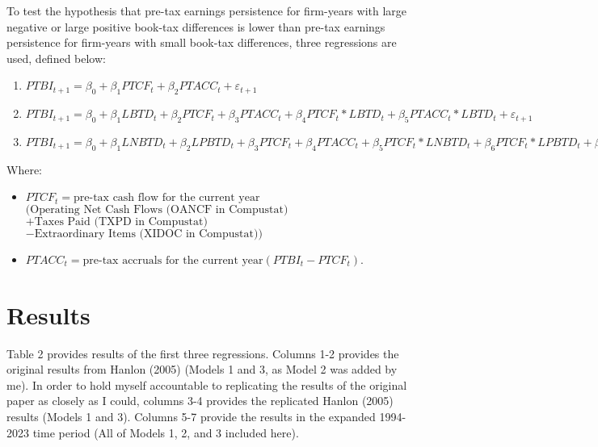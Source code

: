 \documentclass[12pt]{article}
\begin{document}
To test the hypothesis that pre-tax earnings persistence for firm-years with large negative or large positive book-tax differences is lower than pre-tax earnings persistence for firm-years with small book-tax differences, three regressions are used, defined below:
\begin{enumerate}
    \item $PTBI_{t+1} = \beta_0 + \beta_1PTCF_t + \beta_2PTACC_t + \varepsilon_{t+1}$
    \item $PTBI_{t+1} = \beta_0 + \beta_1LBTD_t + \beta_2PTCF_t + \beta_3PTACC_t + \beta_4PTCF_t * LBTD_t + \beta_5PTACC_t * LBTD_t + \varepsilon_{t+1}$
    \item $PTBI_{t+1} = \beta_0 + \beta_1LNBTD_t + \beta_2LPBTD_t + \beta_3PTCF_t + \beta_4PTACC_t + \beta_5PTCF_t * LNBTD_t + \beta_6PTCF_t * LPBTD_t + \beta_7PTACC_t * LNBTD_t + \beta_8PTACC_t * LPBTD_t + \varepsilon_{t+1}$
\end{enumerate}
Where:
\begin{itemize}
   \item $PTCF_t = \text{pre-tax cash flow for the current year}$ \\
      $(\text{Operating Net Cash Flows (OANCF in Compustat)}$ \\
      $+ \text{Taxes Paid (TXPD in Compustat)}$ \\
      $- \text{Extraordinary Items (XIDOC in Compustat)})$

    \item $PTACC_t = \text{pre-tax accruals for the current year} (PTBI_t - PTCF_t)$.
\end{itemize}

\section{Results}
Table 2 provides results of the first three regressions. Columns 1-2 provides the original results from Hanlon (2005) (Models 1 and 3, as Model 2 was added by me). In order to hold myself accountable to replicating the results of the original paper as closely as I could, columns 3-4 provides the replicated Hanlon (2005) results (Models 1 and 3). Columns 5-7 provide the results in the expanded 1994-2023 time period (All of Models 1, 2, and 3 included here). 
\end{document}
